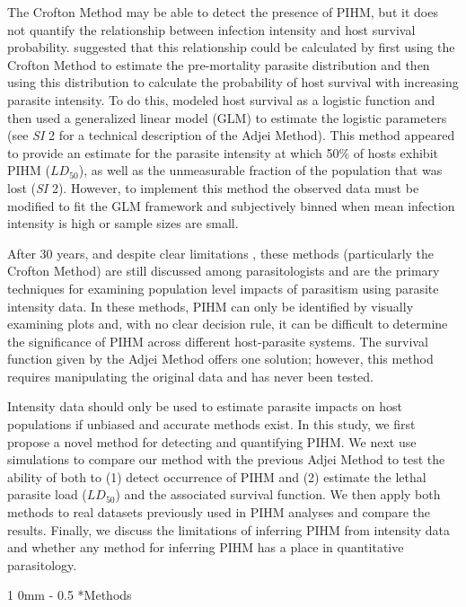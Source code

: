 \documentclass[12pt, a4paper]{article}
\makeatletter
\renewcommand{\section}{\@startsection
{section}%
{1}%
{0mm}%
{-\baselineskip}%
{0.5\baselineskip}%
{\normalfont\bf\large}} %
\makeatother
\begin{document}
The Crofton Method may be able to detect the presence of PIHM, but it does not quantify the relationship between infection intensity and host survival
probability. \cite{Adjei1986} suggested that this relationship
could be calculated by first using the Crofton Method to estimate the pre-mortality parasite distribution and then using this distribution to calculate the
probability of host survival with increasing parasite intensity. To do this,
\cite{Adjei1986} modeled host survival as a logistic function and then used a generalized linear model (GLM) to estimate the logistic parameters (see \emph{SI} 2 for a technical description of the Adjei Method).
This method appeared to provide an estimate for the parasite intensity at which
50\% of hosts exhibit PIHM ($LD_{50}$), as well as the unmeasurable fraction of the
population that was lost (\emph{SI} 2). However, to implement this method the observed data must be
modified to fit the GLM framework and subjectively binned when mean
infection intensity is high or sample sizes are small.

After 30 years, and despite clear limitations \citep{McCallum2000a}, these
methods (particularly the Crofton Method) are still discussed among
parasitologists and are the primary techniques for examining population level
impacts of parasitism using parasite intensity data. In these methods, PIHM can
only be identified by visually examining plots and, with no clear decision
rule, it can be difficult to determine the significance of PIHM across
different host-parasite systems. The survival function given by the Adjei
Method offers one solution; however, this method requires manipulating the
original data and has never been tested.

Intensity data should only
be used to estimate parasite impacts on host populations if unbiased and accurate methods exist. In
this study, we first propose a novel method for detecting and quantifying PIHM. We
next use simulations to compare our method with the previous Adjei
Method to test the ability of both to (1) detect occurrence of PIHM and (2) estimate the
lethal parasite load ($LD_{50}$) and the associated survival function.  We then
apply both methods to real datasets previously used in PIHM analyses and
compare the results. Finally, we discuss the limitations of inferring PIHM
from intensity data and whether any method for inferring PIHM has a place
in quantitative parasitology.

\section*{Methods}
\end{document}
